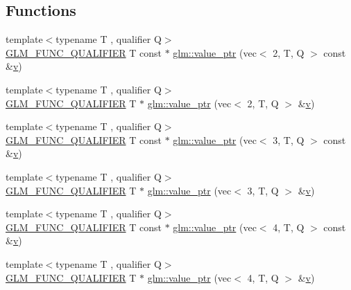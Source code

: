 \subsection*{Functions}
\begin{DoxyCompactItemize}
\item 
{\footnotesize template$<$typename T , qualifier Q$>$ }\\\hyperlink{setup_8hpp_a33fdea6f91c5f834105f7415e2a64407}{G\+L\+M\+\_\+\+F\+U\+N\+C\+\_\+\+Q\+U\+A\+L\+I\+F\+I\+ER} T const  $\ast$ \hyperlink{group__gtc__type__ptr_gaa39964028a0cfbcd18549e33feea7357}{glm\+::value\+\_\+ptr} (vec$<$ 2, T, Q $>$ const \&\hyperlink{_s_d_l__opengl_8h_a10a82eabcb59d2fcd74acee063775f90}{v})
\item 
{\footnotesize template$<$typename T , qualifier Q$>$ }\\\hyperlink{setup_8hpp_a33fdea6f91c5f834105f7415e2a64407}{G\+L\+M\+\_\+\+F\+U\+N\+C\+\_\+\+Q\+U\+A\+L\+I\+F\+I\+ER} T $\ast$ \hyperlink{group__gtc__type__ptr_ga54d4e779df698b9d951378dc0de5149d}{glm\+::value\+\_\+ptr} (vec$<$ 2, T, Q $>$ \&\hyperlink{_s_d_l__opengl_8h_a10a82eabcb59d2fcd74acee063775f90}{v})
\item 
{\footnotesize template$<$typename T , qualifier Q$>$ }\\\hyperlink{setup_8hpp_a33fdea6f91c5f834105f7415e2a64407}{G\+L\+M\+\_\+\+F\+U\+N\+C\+\_\+\+Q\+U\+A\+L\+I\+F\+I\+ER} T const  $\ast$ \hyperlink{group__gtc__type__ptr_ga1b0d55a139927496b86be0e2948279a8}{glm\+::value\+\_\+ptr} (vec$<$ 3, T, Q $>$ const \&\hyperlink{_s_d_l__opengl_8h_a10a82eabcb59d2fcd74acee063775f90}{v})
\item 
{\footnotesize template$<$typename T , qualifier Q$>$ }\\\hyperlink{setup_8hpp_a33fdea6f91c5f834105f7415e2a64407}{G\+L\+M\+\_\+\+F\+U\+N\+C\+\_\+\+Q\+U\+A\+L\+I\+F\+I\+ER} T $\ast$ \hyperlink{group__gtc__type__ptr_gabca52e90fd530ff2e8344d3f66326ccd}{glm\+::value\+\_\+ptr} (vec$<$ 3, T, Q $>$ \&\hyperlink{_s_d_l__opengl_8h_a10a82eabcb59d2fcd74acee063775f90}{v})
\item 
{\footnotesize template$<$typename T , qualifier Q$>$ }\\\hyperlink{setup_8hpp_a33fdea6f91c5f834105f7415e2a64407}{G\+L\+M\+\_\+\+F\+U\+N\+C\+\_\+\+Q\+U\+A\+L\+I\+F\+I\+ER} T const  $\ast$ \hyperlink{group__gtc__type__ptr_gace63685baa09872656962c2695900c48}{glm\+::value\+\_\+ptr} (vec$<$ 4, T, Q $>$ const \&\hyperlink{_s_d_l__opengl_8h_a10a82eabcb59d2fcd74acee063775f90}{v})
\item 
{\footnotesize template$<$typename T , qualifier Q$>$ }\\\hyperlink{setup_8hpp_a33fdea6f91c5f834105f7415e2a64407}{G\+L\+M\+\_\+\+F\+U\+N\+C\+\_\+\+Q\+U\+A\+L\+I\+F\+I\+ER} T $\ast$ \hyperlink{group__gtc__type__ptr_gae0ad6ab684abf10a87cadb95a9137fa2}{glm\+::value\+\_\+ptr} (vec$<$ 4, T, Q $>$ \&\hyperlink{_s_d_l__opengl_8h_a10a82eabcb59d2fcd74acee063775f90}{v})

\end{DoxyCompactItemize}
